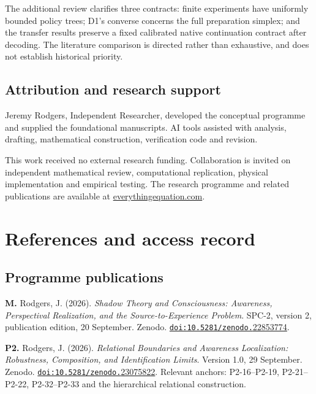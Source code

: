 \documentclass[
  11pt,
  a4paper,
]{article}
\begin{document}
The additional review clarifies three contracts: finite experiments have
uniformly bounded policy trees; D1's converse concerns the full
preparation simplex; and the transfer results preserve a fixed
calibrated native continuation contract after decoding. The
literature comparison is directed rather than exhaustive, and does not
establish historical priority.

\subsection{Attribution and research
support}\label{attribution-and-research-support}

Jeremy Rodgers, Independent Researcher, developed the conceptual
programme and supplied the foundational manuscripts. AI tools assisted
with analysis, drafting, mathematical construction, verification code
and revision. 

This work received no external research funding. Collaboration is
invited on independent mathematical review, computational replication,
physical implementation and empirical testing. The research programme
and related publications are available at
\href{https://www.everythingequation.com}{everythingequation.com}.

\section{References and access
record}\label{references-and-access-record}

\subsection{Programme publications}\label{programme-publications}

\textbf{M.} Rodgers, J. (2026). \emph{Shadow Theory and Consciousness:
Awareness, Perspectival Realization, and the Source-to-Experience
Problem}. SPC-2, version 2, publication edition, 20 September. Zenodo.
\href{https://doi.org/10.5281/zenodo.22853774}{\nolinkurl{doi:10.5281/zenodo.}\mbox{22853774}}.

\textbf{P2.} Rodgers, J. (2026). \emph{Relational Boundaries and
Awareness Localization: Robustness, Composition, and Identification
Limits}. Version 1.0, 29 September. Zenodo.
\href{https://doi.org/10.5281/zenodo.23075822}{\nolinkurl{doi:10.5281/zenodo.}\mbox{23075822}}.
Relevant anchors: P2-16--P2-19, P2-21--P2-22, P2-32--P2-33 and the
hierarchical relational construction.
\end{document}
